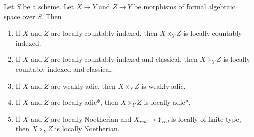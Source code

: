 %
\begin{lemma}
\label{lemma-types-fibre-products}
Let $S$ be a scheme. Let $X \to Y$ and $Z \to Y$ be
morphisms of formal algebraic space over $S$. Then
\begin{enumerate}
\item If $X$ and $Z$ are locally countably indexed, then $X \times_Y Z$
is locally countably indexed.
\item If $X$ and $Z$ are locally countably indexed and classical,
then $X \times_Y Z$ is locally countably indexed and classical.
\item If $X$ and $Z$ are weakly adic, then $X \times_Y Z$
is weakly adic.
\item If $X$ and $Z$ are locally adic*, then $X \times_Y Z$ is
locally adic*.
\item If $X$ and $Z$ are locally Noetherian and $X_{red} \to Y_{red}$
is locally of finite type, then $X \times_Y Z$ is locally Noetherian.
\end{enumerate}
\end{lemma}

